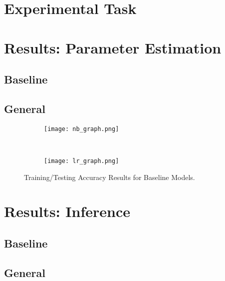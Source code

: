 \documentclass{article}
\begin{document}


\section{Experimental Task}
\label{sec:task}



\section{Results: Parameter Estimation}
\label{sec:results-param}
\subsection{Baseline}
\subsection{General}


\begin{figure}
  \centering
  \begin{subfigure}[b]{0.47\textwidth}
    \centering
    \texttt{[image: nb\_graph.png]}
    \caption*{}
    \label{fig:nb_graph}
  \end{subfigure}
  ~
  \begin{subfigure}[b]{0.47\textwidth}
    \centering
    \texttt{[image: lr\_graph.png]}
    \caption*{}
    \label{fig:lr_graph}
  \end{subfigure}
  \vspace{-10pt}
  \caption{Training/Testing Accuracy Results for Baseline Models.}
\end{figure}

\section{Results: Inference}
\label{sec:results-inference}
\subsection{Baseline}
\subsection{General}
\end{document}
